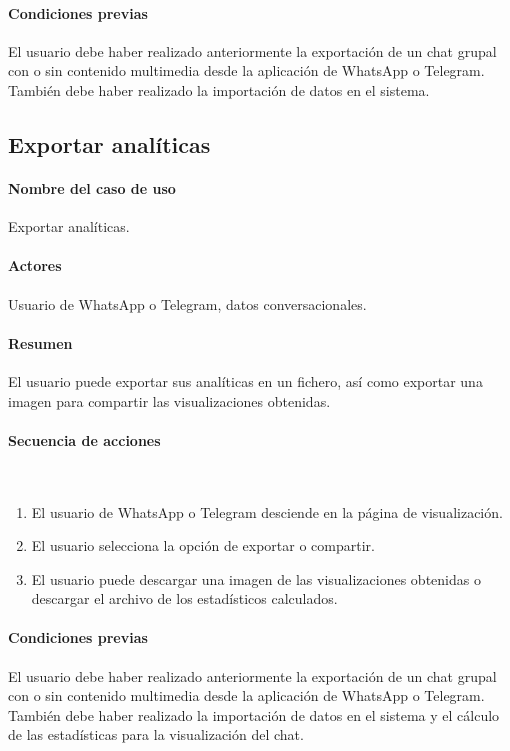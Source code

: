 \paragraph{Condiciones previas} El usuario debe haber realizado anteriormente la exportación de un chat grupal con o sin contenido multimedia desde la aplicación de WhatsApp o Telegram. También debe haber realizado la importación de datos en el sistema.

\subsection{Exportar analíticas}

\paragraph{Nombre del caso de uso} Exportar analíticas.
\paragraph{Actores} Usuario de WhatsApp o Telegram, datos conversacionales.
\paragraph{Resumen} El usuario puede exportar sus analíticas en un fichero, así como exportar una imagen para compartir las visualizaciones obtenidas.
\paragraph{Secuencia de acciones}\mbox{}\\

\begin{enumerate}
	\item El usuario de WhatsApp o Telegram desciende en la página de visualización.
	\item El usuario selecciona la opción de exportar o compartir.
	\item El usuario puede descargar una imagen de las visualizaciones obtenidas o descargar el archivo de los estadísticos calculados.
\end{enumerate}

\paragraph{Condiciones previas} El usuario debe haber realizado anteriormente la exportación de un chat grupal con o sin contenido multimedia desde la aplicación de WhatsApp o Telegram. También debe haber realizado la importación de datos en el sistema y el cálculo de las estadísticas para la visualización del chat.



